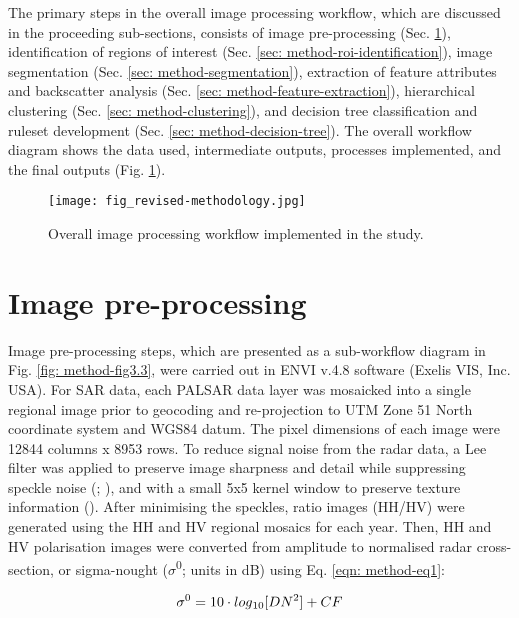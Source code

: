 The primary steps in the overall image processing workflow, which are discussed in the proceeding sub-sections, consists of image pre-processing (Sec. \ref{sec: method-preprocessing}), identification of regions of interest (Sec. \ref{sec: method-roi-identification}), image segmentation (Sec. \ref{sec: method-segmentation}), extraction of feature attributes and backscatter analysis (Sec. \ref{sec: method-feature-extraction}), hierarchical clustering (Sec. \ref{sec: method-clustering}), and decision tree classification and ruleset development (Sec. \ref{sec: method-decision-tree}). The overall workflow diagram shows the data used, intermediate outputs, processes implemented, and the final outputs (Fig. \ref{fig: method-fig3.2}).

\begin{figure}
	\centering
	\texttt{[image: fig\_revised-methodology.jpg]}
	\caption[Overall image processing workflow implemented in the study.]{Overall image processing workflow implemented in the study.}
	\label{fig: method-fig3.2}
\end{figure}

\section{Image pre-processing}
\label{sec: method-preprocessing}

Image pre-processing steps, which are presented as a sub-workflow diagram in Fig. \ref{fig: method-fig3.3}, were carried out in ENVI v.4.8 software (Exelis VIS, Inc. USA). For SAR data, each PALSAR data layer was mosaicked into a single regional image prior to geocoding and re-projection to UTM Zone 51 North coordinate system and WGS84 datum. The pixel dimensions of each image were 12844 columns x 8953 rows. To reduce signal noise from the radar data, a Lee filter was applied to preserve image sharpness and detail while suppressing speckle noise (\cite{lee_digital_1980}; \cite{lee_speckle_1981}), and with a small 5x5 kernel window to preserve texture information (\cite{lee_speckle_1994}). After minimising the speckles, ratio images (HH/HV) were generated using the HH and HV regional mosaics for each year. Then, HH and HV polarisation images were converted from amplitude to normalised radar cross-section, or sigma-nought ($\sigma$\textsuperscript{0}; units in dB) using Eq. \ref{eqn: method-eq1}:

\begin{equation} \label{eqn: method-eq1}
		\sigma^0=10\cdot log\textsubscript{10}[DN^2]+CF
\end{equation}

